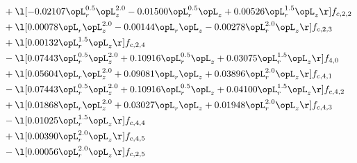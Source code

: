 \begin{alignat}{2}
& + \l[  -0.02107 \opL_r^{0.5} \opL_z^{2.0}   -0.01500 \opL_r^{0.5} \opL_z +  0.00526 \opL_r^{1.5} \opL_z  \r] f_{c,2,2} \nonumber \\ 
& + \l[  0.00078 \opL_r \opL_z^{2.0}   -0.00144 \opL_r \opL_z   -0.00278 \opL_r^{2.0} \opL_z  \r] f_{c,2,3} \nonumber \\ 
& + \l[  0.00132 \opL_r^{1.5} \opL_z  \r] f_{c,2,4} \nonumber \\ 
& - \l[  0.07443 \opL_r^{0.5} \opL_z^{2.0} +  0.10916 \opL_r^{0.5} \opL_z +  0.03075 \opL_r^{1.5} \opL_z  \r] f_{4,0} \nonumber \\ 
& + \l[  0.05604 \opL_r \opL_z^{2.0} +  0.09081 \opL_r \opL_z +  0.03896 \opL_r^{2.0} \opL_z  \r] f_{c,4,1} \nonumber \\ 
& - \l[  0.07443 \opL_r^{0.5} \opL_z^{2.0} +  0.10916 \opL_r^{0.5} \opL_z +  0.04100 \opL_r^{1.5} \opL_z  \r] f_{c,4,2} \nonumber \\ 
& + \l[  0.01868 \opL_r \opL_z^{2.0} +  0.03027 \opL_r \opL_z +  0.01948 \opL_r^{2.0} \opL_z  \r] f_{c,4,3} \nonumber \\ 
& - \l[  0.01025 \opL_r^{1.5} \opL_z  \r] f_{c,4,4} \nonumber \\ 
& + \l[  0.00390 \opL_r^{2.0} \opL_z  \r] f_{c,4,5} \nonumber \\ 
& - \l[  0.00056 \opL_r^{2.0} \opL_z  \r] f_{c,2,5} \nonumber \\ 
\end{alignat} 


